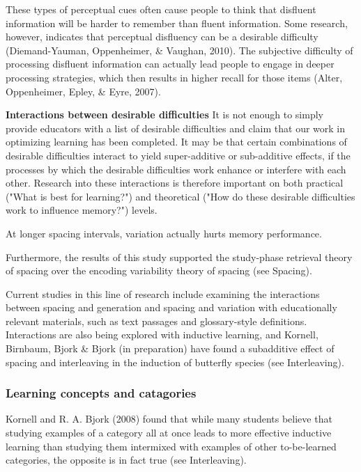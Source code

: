 These types of perceptual cues often cause people to think that disfluent information will be harder to remember than fluent information. Some research, however, indicates that perceptual disfluency can be a desirable difficulty (Diemand-Yauman, Oppenheimer, \& Vaughan, 2010). The subjective difficulty of processing disfluent information can actually lead people to engage in deeper processing strategies, which then results in higher recall for those items (Alter, Oppenheimer, Epley, \& Eyre, 2007).

\textbf{Interactions between desirable difficulties}
It is not enough to simply provide educators with a list of desirable difficulties and claim that our work in optimizing learning has been completed. It may be that certain combinations of desirable difficulties interact to yield super-additive or sub-additive effects, if the processes by which the desirable difficulties work enhance or interfere with each other. Research into these interactions is therefore important on both practical ("What is best for learning?") and theoretical ("How do these desirable difficulties work to influence memory?") levels.

At longer spacing intervals, variation actually hurts memory performance.

Furthermore, the results of this study supported the study-phase retrieval theory of spacing over the encoding variability theory of spacing (see Spacing).

Current studies in this line of research include examining the interactions between spacing and generation and spacing and variation with educationally relevant materials, such as text passages and glossary-style definitions. Interactions are also being explored with inductive learning, and Kornell, Birnbaum, Bjork \& Bjork (in preparation) have found a subadditive effect of spacing and interleaving in the induction of butterfly species (see Interleaving).

\subsubsection{Learning concepts and catagories}
Kornell and R. A. Bjork (2008) found that while many students believe that studying examples of a category all at once leads to more effective inductive learning than studying them intermixed with examples of other to-be-learned categories, the opposite is in fact true (see Interleaving).


